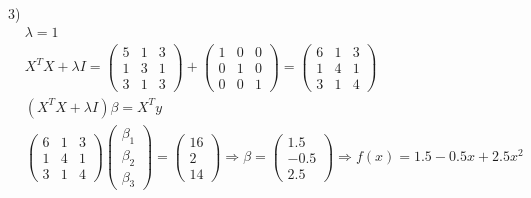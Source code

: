 \documentclass{report}
\begin{document}
\par 3)
\begin{align*}
& \lambda = 1 \\
& X^T X + \lambda I = \begin{pmatrix}
    5 & 1 & 3 \\
    1 & 3 & 1 \\
    3 & 1 & 3
\end{pmatrix} + \begin{pmatrix}
    1 & 0 & 0 \\
    0 & 1 & 0 \\
    0 & 0 & 1
\end{pmatrix} = \begin{pmatrix}
    6 & 1 & 3 \\
    1 & 4 & 1 \\
    3 & 1 & 4
\end{pmatrix} \\
& (X^T X + \lambda I) \beta = X^T y \\
& \begin{pmatrix}
    6 & 1 & 3 \\
    1 & 4 & 1 \\
    3 & 1 & 4
\end{pmatrix} \begin{pmatrix} \beta_1 \\ \beta_2 \\ \beta_3 \end{pmatrix} = \begin{pmatrix} 16 \\ 2 \\ 14 \end{pmatrix}
\Rightarrow \beta = \begin{pmatrix} 1.5 \\ -0.5 \\ 2.5 \end{pmatrix} \Rightarrow f(x) = 1.5 - 0.5x + 2.5x^2
\end{align*}
\end{document}
